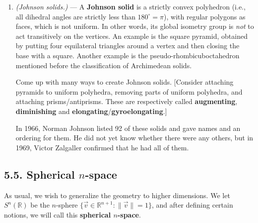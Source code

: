 \documentclass[leqno]{book}
\begin{document}
\begin{enumerate}
(g) Show that the points form a rhombic triacontahedron if and only if $a=b$.  Furthermore, conclude that the faces of a rhombic triacontahedron are \textbf{golden rhombi}; in other words, the ratio of their diagonals is $\phi$.

(h) Now explain how to get the icosidodecahedron.

This strategy can be used to obtain the coordinates of any Catalan and Archimedean solid, but many of the constructions involve nontrivial polynomial solving.  Those with mathematical software are encouraged to try to construct these solids. %

\item\emph{(Johnson solids.)} \---- A \textbf{Johnson solid} is a strictly convex polyhedron (i.e., all dihedral angles are strictly less than $180^\circ=\pi$), with regular polygons as faces, which is not uniform.  In other words, its global isometry group is \emph{not} to act transitively on the vertices.  An example is the square pyramid, obtained by putting four equilateral triangles around a vertex and then closing the base with a square.  Another example is the pseudo-rhombicuboctahedron mentioned before the classification of Archimedean solids.

Come up with many ways to create Johnson solids.  [Consider attaching pyramids to uniform polyhedra, removing parts of uniform polyhedra, and attaching prisms/antiprisms.  These are respectively called \textbf{augmenting}, \textbf{diminishing} and \textbf{elongating}/\textbf{gyroelongating}.]

In 1966, Norman Johnson listed 92 of these solids and gave names and an ordering for them.  He did not yet know whether there were any others, but in 1969, Victor Zalgaller confirmed that he had all of them.
\end{enumerate}

\subsection*{5.5. Spherical $n$-space}
As usual, we wish to generalize the geometry to higher dimensions.  We let $S^n(\mathbb R)$ be the $n$-sphere $\{\vec v\in\mathbb R^{n+1}:\|\vec v\|=1\}$, and after defining certain notions, we will call this \textbf{spherical $n$-space}.
\end{document}
